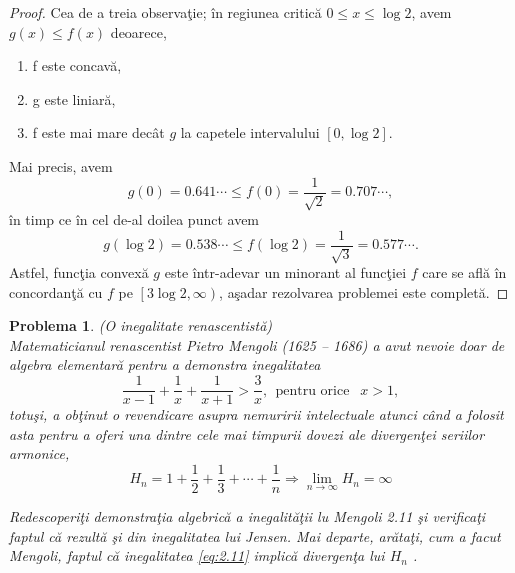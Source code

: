\documentclass[a4paper,12pt,oneside]{report}
\newtheorem{problem}{Problema}
\begin{document}
\begin{proof}
Cea de a treia observa\c{t}ie; \^{i}n regiunea critic\u{a} \(0\leq  x \leq \log2\), avem \(g\left ( x \right ) \leq  f\left ( x \right )\) deoarece,
\begin{enumerate}
  \item f este concav\u{a},
  \item g este liniar\u{a},
  \item f este mai mare dec\^{a}t \(g\) la capetele intervalului \(\left [ 0 , \log 2 \right ]\).
\end{enumerate}
Mai precis, avem
\begin{displaymath}
  g\left ( 0 \right ) = 0.641\cdots \leq f\left ( 0 \right ) = \frac{1}{\sqrt{2}} = 0.707\cdots,
\end{displaymath}
\^{i}n timp ce \^{i}n cel de-al doilea punct avem
\begin{displaymath}
  g\left ( \log 2 \right ) = 0.538\cdots  \leq f\left ( \log2 \right ) = \frac{1}{\sqrt{3}} = 0.577\cdots.
\end{displaymath}
Astfel, func\c{t}ia convex\u{a} \(g\) este \^{i}ntr-adevar un minorant al func\c{t}iei \(f\) care se afl\u{a} \^{i}n concordan\c{t}\u{a} cu \(f\) pe \(\left [ 3\log 2 , \infty  \right )\), a\c{s}adar rezolvarea problemei este complet\u{a}.
\end{proof}
\begin{problem} (O inegalitate renascentist\u{a})\\
   Matematicianul renascentist Pietro Mengoli (1625 – 1686) a avut nevoie doar de algebra elementar\u{a} pentru a demonstra inegalitatea
 \begin{displaymath}
   \frac{1}{x - 1} + \frac{1}{x} + \frac{1}{x + 1} > \frac{3}{x} , ~~ \text{pentru orice } ~~  x > 1, \label{eq:2.11} \tag{2.11}
 \end{displaymath}
totu\c{s}i, a ob\c{t}inut o revendicare asupra nemuririi intelectuale atunci c\^{a}nd a folosit asta pentru a oferi una dintre cele mai timpurii dovezi ale divergen\c{t}ei seriilor armonice,
\begin{displaymath}
  H_{n} = 1 + \frac{1}{2} + \frac{1}{3} + \cdots + \frac{1}{n} \Rightarrow \lim_{n \to \infty } H_{n} = \infty \label{eq:2.12} \tag{2.12}
\end{displaymath}

Redescoperi\c{t}i demonstra\c{t}ia algebric\u{a} a inegalit\u{a}\c{t}ii lu Mengoli 2.11 \c{s}i verifica\c{t}i faptul c\u{a} rezult\u{a} \c{s}i din inegalitatea lui Jensen. Mai departe, ar\u{a}ta\c{t}i, cum a facut Mengoli, faptul c\u{a} inegalitatea \ref{eq:2.11} implic\u{a} divergen\c{t}a lui \(H_{n}\) .
\end{problem}
\end{document}
